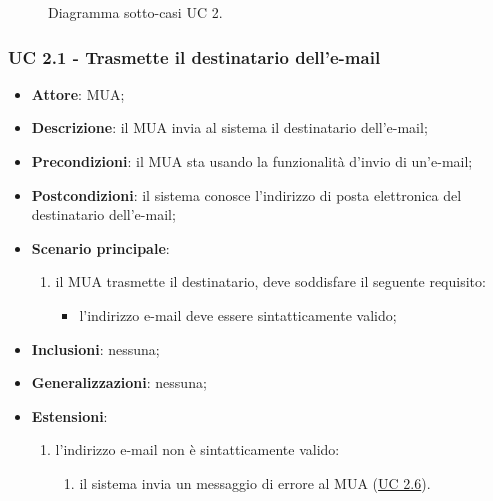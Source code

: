     \begin{figure}[h]
        \centering
        \caption{Diagramma sotto-casi UC 2.}
    \end{figure}

    \subsubsection{UC 2.1 - Trasmette il destinatario dell'e-mail} \label{sec:UC2.1}
    \begin{itemize}
        \item \textbf{Attore}: MUA;
        \item \textbf{Descrizione}: il MUA invia al sistema il destinatario dell'e-mail;
        \item \textbf{Precondizioni}: il MUA sta usando la funzionalità d'invio di un'e-mail;
        \item \textbf{Postcondizioni}: il sistema conosce l'indirizzo di posta elettronica del destinatario dell'e-mail;
        \item \textbf{Scenario principale}:
            \begin{enumerate}
                \item il MUA trasmette il destinatario, deve soddisfare il seguente requisito:
                    \begin{itemize}
                        \item l'indirizzo e-mail deve essere sintatticamente valido;
                    \end{itemize}
            \end{enumerate}
        \item \textbf{Inclusioni}: nessuna;
        \item \textbf{Generalizzazioni}: nessuna;
        \item \textbf{Estensioni}:
            \begin{enumerate}[label=\alph*.]
                \item l'indirizzo e-mail non è sintatticamente valido:
                \begin{enumerate}[label=\arabic*.]
                    \item il sistema invia un messaggio di errore al MUA (\hyperref[sec:UC2.6]{UC 2.6}).
                \end{enumerate}
            \end{enumerate}
    \end{itemize}


